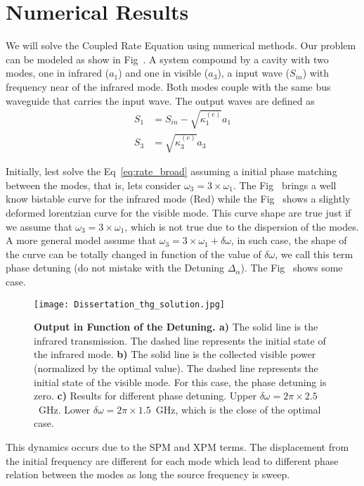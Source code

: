 \section{Numerical Results}

We will solve the Coupled Rate Equation using numerical methods. Our problem can be modeled as show in Fig~. A system compound by a cavity with two modes, one in infrared ($a_1$) and one in visible ($a_3$), a input wave ($S_{in}$) with frequency near of the infrared mode. Both modes couple with the same bus waveguide that carries the input wave. The output waves are defined as 
\begin{subequations}
    \begin{align}
        S_1 &= S_{in} - \sqrt{\kappa^{(e)}_1}a_1\\
        S_3 &= \sqrt{\kappa^{(e)}_3}a_3
    \end{align}
\end{subequations}

Initially, lest solve the Eq~\ref{eq:rate_broad} assuming a initial phase matching between the modes, that is, lets consider $\omega_3 = 3\times\omega_1$. The Fig~
brings a well know bistable curve for the infrared mode (Red) while the Fig~ 
shows a slightly deformed lorentzian curve for the visible mode. This curve shape are true just if we assume that $\omega_3 = 3\times\omega_1$, which is not true due to the dispersion of the modes. A more general model assume that $\omega_3 = 3\times\omega_1 + \delta\omega$, in such case, the shape of the curve can be totally changed in function of the value of $\delta\omega$, we call this term phase detuning (do not mistake with the Detuning $\Delta_\alpha$). The Fig~
shows some case. 

\begin{figure}[!h]
    \centering
    \texttt{[image: Dissertation\_thg\_solution.jpg]}
    \caption{\textbf{Output in Function of the Detuning. a)} The solid line is the infrared transmission. The dashed line represents the initial state of the infrared mode. \textbf{b)} The solid line is the collected visible power (normalized by the optimal value). The dashed line represents the initial state of the visible mode. For this case, the phase detuning is zero. \textbf{c)} Results for different phase detuning. Upper $\delta\omega = 2\pi\times2.5$~GHz. Lower $\delta\omega = 2\pi\times1.5$~GHz, which is the close of the optimal case.}
    \label{fig:temporal_solution}
\end{figure}
This dynamics occurs due to the SPM and XPM terms. The displacement from the initial frequency are different for each mode which lead to different phase relation between the modes as long the source frequency is sweep. 

